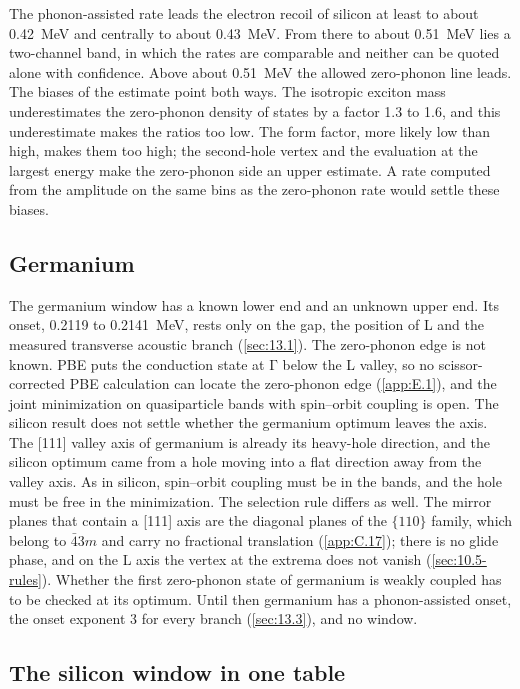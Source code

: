 The phonon-assisted rate leads the electron recoil of silicon at least to about \SI{0.42}{MeV} and centrally to about \SI{0.43}{MeV}. From there to about \SI{0.51}{MeV} lies a two-channel band, in which the rates are comparable and neither can be quoted alone with confidence. Above about \SI{0.51}{MeV} the allowed zero-phonon line leads. The biases of the estimate point both ways. The isotropic exciton mass underestimates the zero-phonon density of states by a factor 1.3 to 1.6, and this underestimate makes the ratios too low. The form factor, more likely low than high, makes them too high; the second-hole vertex and the evaluation at the largest energy make the zero-phonon side an upper estimate. A rate computed from the amplitude on the same bins as the zero-phonon rate would settle these biases.

\subsection{Germanium}\label{sec:13.9-ge-gaas}

The germanium window has a known lower end and an unknown upper end. Its onset, 0.2119 to \SI{0.2141}{MeV}, rests only on the gap, the position of L and the measured transverse acoustic branch (\cref{sec:13.1}). The zero-phonon edge is not known. PBE puts the conduction state at $\mathrm{\Gamma}$ below the L valley, so no scissor-corrected PBE calculation can locate the zero-phonon edge (\cref{app:E.1}), and the joint minimization on quasiparticle bands with spin--orbit coupling is open. The silicon result does not settle whether the germanium optimum leaves the axis. The [111] valley axis of germanium is already its heavy-hole direction, and the silicon optimum came from a hole moving into a flat direction away from the valley axis. As in silicon, spin--orbit coupling must be in the bands, and the hole must be free in the minimization. The selection rule differs as well. The mirror planes that contain a [111] axis are the diagonal planes of the $\{110\}$ family, which belong to $\bar43m$ and carry no fractional translation (\cref{app:C.17}); there is no glide phase, and on the L axis the vertex at the extrema does not vanish (\cref{sec:10.5-rules}). Whether the first zero-phonon state of germanium is weakly coupled has to be checked at its optimum. Until then germanium has a phonon-assisted onset, the onset exponent 3 for every branch (\cref{sec:13.3}), and no window.

\subsection{The silicon window in one table}\label{sec:13.9-table}

